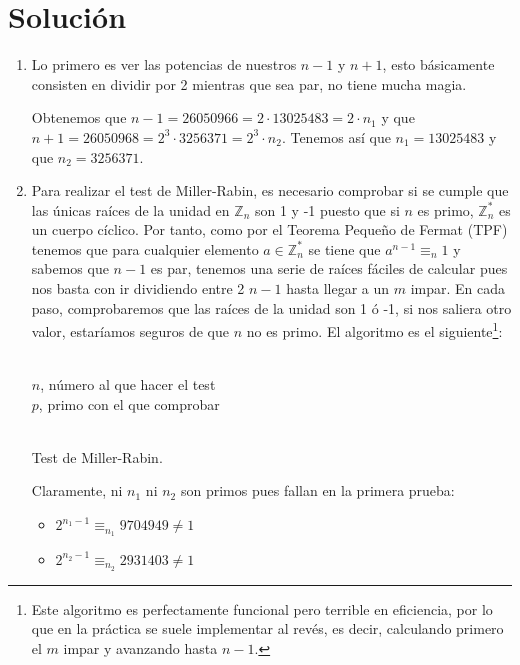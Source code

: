 \section*{Solución}
	\begin{enumerate}
		\item Lo primero es ver las potencias de nuestros $n-1$ y $n+1$, esto básicamente consisten en dividir
		por 2 mientras que sea par, no tiene mucha magia.
		
		Obtenemos que $n-1 = 26050966 = 2 \cdot 13025483 = 2 \cdot n_1$ y que $n+1 = 26050968 = 2^3 \cdot 3256371
		= 2^3 \cdot n_2$. Tenemos así que $n_1 = 13025483$ y que $n_2 = 3256371$.
		
		\item Para realizar el test de Miller-Rabin, es necesario comprobar si se cumple que las únicas raíces de
		la unidad en $\mathbb{Z}_n$ son 1 y -1 puesto que si $n$ es primo, $\mathbb{Z}^*_n$ es un cuerpo cíclico.
		Por tanto, como por el Teorema Pequeño de Fermat (TPF) tenemos que para cualquier elemento $a \in
		\mathbb{Z}^*_n$ se tiene que $a^{n-1} \equiv_n 1$ y sabemos que $n-1$ es par, tenemos una serie de raíces
		fáciles de calcular pues nos basta con ir dividiendo entre 2 $n-1$ hasta llegar a un $m$ impar. En cada
		paso, comprobaremos que las raíces de la unidad son 1 ó -1, si nos saliera otro valor, estaríamos seguros
		de que $n$ no es primo. El algoritmo es el siguiente\footnote{Este algoritmo es perfectamente funcional
		pero terrible en eficiencia, por lo que en la práctica se suele implementar al revés, es decir, calculando
		primero el $m$ impar y avanzando hasta $n-1$.}:
		
		\begin{algorithm}[H]
		\begin{algorithmic}[1]
			\REQUIRE \ \\
				\texttt{$n$}, número al que hacer el test \\
				\texttt{$p$}, primo con el que comprobar \\ \
			\ELSE
					\ENDIF
				\ENDWHILE
					\ELSE
					\ENDIF
				\ENDIF
			\ENDIF
		\end{algorithmic}
		\caption{Test de Miller-Rabin.}
		\label{Miller-Rabin}
		\end{algorithm}
		
		Claramente, ni $n_1$ ni $n_2$ son primos pues fallan en la primera prueba:
		\begin{itemize}
			\item $2^{n_1-1} \equiv_{n_1} 9704949 \neq 1$
			\item $2^{n_2-1} \equiv_{n_2} 2931403 \neq 1$
		\end{itemize}
	\end{enumerate}